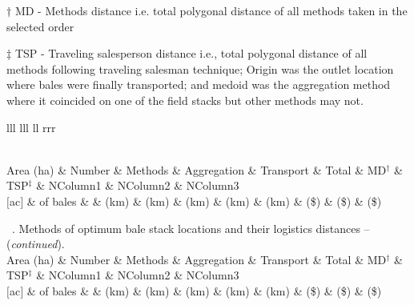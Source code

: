 \documentclass[phd]{ndsu-thesis-2022}
\newcommand\tabletopinfols{
\toprule
Area (ha) & Number  & Methods & Aggregation & Transport & Total & MD$^\dag$ & TSP$^\ddag$ & NColumn1  &  NColumn2  &  NColumn3 \\
$[$ac$]$ & of bales  &  & (km) & (km) & (km) & (km) & (km) & (\$) & (\$) & (\$) \\
    \midrule 
}
\begin{document}
\vspace{2ex}
\setlength\LTleft{0pt}
\setlength\LTright{0pt}

\begin{landscape}
{\small 
{\renewcommand{\arraystretch}{0.6}
\begin{ThreePartTable}
  \begin{TableNotes}
  \baselineskip
    \item[] $\dag$ MD - Methods distance i.e. total polygonal distance of all methods taken in the selected order    
    \item[] $\ddag$ TSP - Traveling salesperson distance i.e., total polygonal distance of all methods following traveling salesman technique; Origin was the outlet location where bales were finally transported; and medoid was the aggregation method where it coincided on one of the field stacks but other methods may not.
  \end{TableNotes}
  \begin{longtable}{lll lll ll rrr}
  \caption{\normalsize A long table - spanning 3 pages - an example taken from our research group work on ``Methods of optimum bale stack locations and their logistics distances and methods combined distances.''}
  \label{tab16}\\[-2ex]     
  \tabletopinfols%
    \endfirsthead
    
{{\normalsize\tablename\ \thetable{}. Methods of optimum bale stack locations and their logistics distances  -- (\emph{continued}).}} \\[2ex]
 \tabletopinfols%
    \endhead
    
    \endfoot
    \bottomrule
    \insertTableNotes
    \endlastfoot
        

\end{longtable}
\end{ThreePartTable}}}
\end{landscape}
\end{document}
